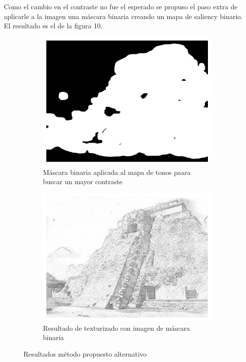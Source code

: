 \documentclass[letterpaper, 10 pt, conference]{ieeeconf}  %
\begin{document}
Como el cambio en el contraste no fue el esperado se propuso el paso extra de aplicarle a la imagen una máscara binaria creando un mapa de saliency binario. El resultado es el de la figura 10.

\begin{figure}[H]
\centering
    \begin{subfigure}{0.45\linewidth}
\includegraphics[width=\linewidth, scale=0.05]{images/sal_bin.png} 
    \caption{Máscara binaria aplicada al mapa de tonos paara buscar un mayor contraste}
\label{fig:1a}
    \end{subfigure}\hfill
    \begin{subfigure}{0.45\linewidth}
\includegraphics[width=\linewidth, scale=0.1]{images/res_bin.png}
    \caption{Resultado de texturizado con imagen de máscara binaria}
\label{dib-hist}
    \end{subfigure}
\caption{Resultados método propuesto alternativo}
    \label{res1}
    \end{figure}
\end{document}
